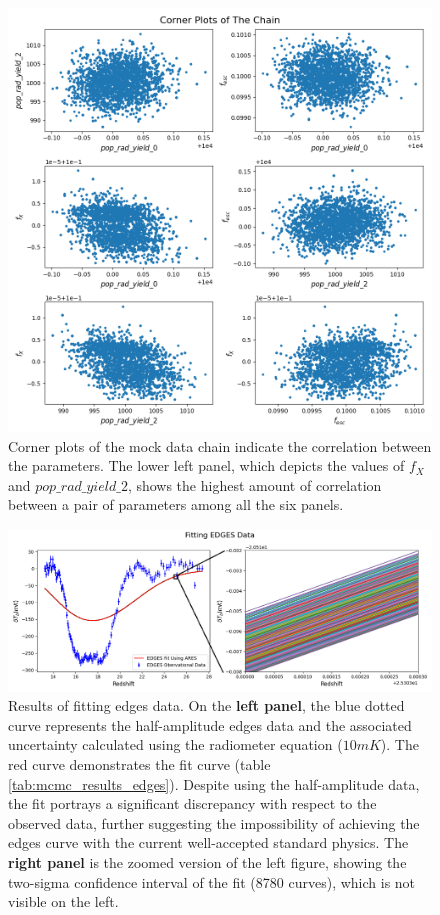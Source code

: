 \documentclass[12pt, TexShade, letterpaper]{report}
\begin{document}
\begin{figure}[h!]
\centering
\includegraphics[scale =0.6]{corner_plots_known_curve.png}
\caption[Corner plots of the mock data chain]{Corner plots of the mock data chain indicate the correlation between the parameters. The lower left panel, which depicts the values of $f_X$ and $pop\_rad\_yield\_2$, shows the highest amount of correlation between a pair of parameters among all the six panels.}
\label{fig:corner_plots_known_curve}
\end{figure}
\begin{figure}[h!]
\centering
\includegraphics[scale =0.7]{fit_curve_edges.png}
\caption[Results of fitting \gls{edges} data]{Results of fitting \gls{edges} data. On the \textbf{left panel}, the blue dotted curve represents the half-amplitude \gls{edges} data and the associated uncertainty calculated using the radiometer equation ($10mK$). The red curve demonstrates the fit curve (table \ref{tab:mcmc_results_edges}). Despite using the half-amplitude data, the fit portrays a significant discrepancy with respect to the observed data, further suggesting the impossibility of achieving the \gls{edges} curve with the current well-accepted standard physics. The \textbf{right panel} is the zoomed version of the left figure, showing the two-sigma confidence interval of the fit (8780 curves), which is not visible on the left.}
\label{fig:fit_curve_edges}
\end{figure}
\end{document}
